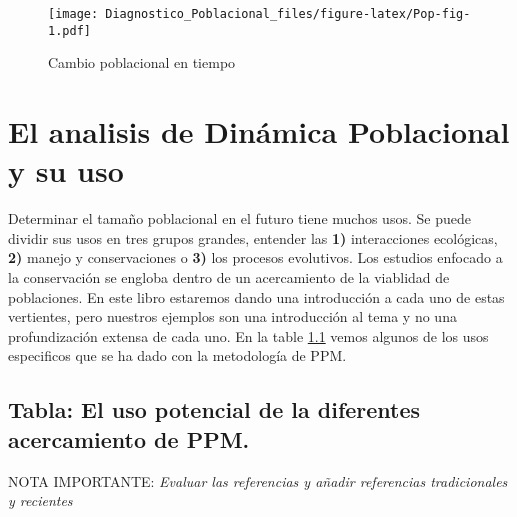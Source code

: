 \documentclass[
]{book}
\theoremstyle{definition}
\theoremstyle{definition}
\theoremstyle{definition}
\theoremstyle{definition}
\theoremstyle{remark}
\begin{document}
\begin{figure}
\centering
\texttt{[image: Diagnostico\_Poblacional\_files/figure-latex/Pop-fig-1.pdf]}
\caption{\label{fig:Pop-fig}Cambio poblacional en tiempo}
\end{figure}

\hypertarget{el-analisis-de-dinuxe1mica-poblacional-y-su-uso}{%
\section{El analisis de Dinámica Poblacional y su uso}\label{el-analisis-de-dinuxe1mica-poblacional-y-su-uso}}

Determinar el tamaño poblacional en el futuro tiene muchos usos. Se puede dividir sus usos en tres grupos grandes, entender las \textbf{1)} interacciones ecológicas, \textbf{2)} manejo y conservaciones o \textbf{3)} los procesos evolutivos. Los estudios enfocado a la conservación se engloba dentro de un acercamiento de la viablidad de poblaciones. En este libro estaremos dando una introducción a cada uno de estas vertientes, pero nuestros ejemplos son una introducción al tema y no una profundización extensa de cada uno. En la table \ref{USO} vemos algunos de los usos especificos que se ha dado con la metodología de PPM.

\hypertarget{USO}{%
\subsection{Tabla: El uso potencial de la diferentes acercamiento de PPM.}\label{USO}}

NOTA IMPORTANTE: \emph{Evaluar las referencias y añadir referencias tradicionales y recientes}
\end{document}
